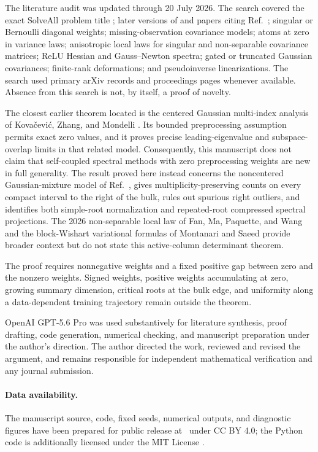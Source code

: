 The literature audit was updated through 20 July 2026.  The search covered the
exact SolveAll problem title \cite{SolveAllProblem}; later versions of and
papers citing Ref.~\cite{BenArousEtAl2025}; singular or Bernoulli diagonal
weights; missing-observation covariance models; atoms at zero in variance
laws; anisotropic local laws for singular and non-separable covariance
matrices; ReLU Hessian and Gauss--Newton spectra; gated or truncated Gaussian
covariances; finite-rank deformations; and pseudoinverse linearizations.  The
search used primary arXiv records and proceedings pages whenever available.
Absence from this search is not, by itself, a proof of novelty.

The closest earlier theorem located is the centered Gaussian multi-index
analysis of Kova\v{c}evi\'c, Zhang, and Mondelli
\cite{KovacevicEtAl2025}.  Its bounded preprocessing assumption permits exact
zero values, and it proves precise leading-eigenvalue and subspace-overlap
limits in that related model.  Consequently, this manuscript does not claim
that self-coupled spectral methods with zero preprocessing weights are new in
full generality.  The result proved here instead concerns the noncentered
Gaussian-mixture model of Ref.~\cite{BenArousEtAl2025}, gives
multiplicity-preserving counts on every compact interval to the right of the
bulk, rules out spurious right outliers, and identifies both simple-root
normalization and repeated-root compressed spectral projections.  The 2026
non-separable local law of Fan, Ma, Paquette, and Wang
\cite{FanEtAl2026} and the block-Wishart variational formulas of Montanari and
Saeed \cite{MontanariSaeed2026} provide broader context but do not state this
active-column determinant theorem.

The proof requires nonnegative weights and a fixed positive gap between zero
and the nonzero weights. Signed weights, positive weights accumulating at
zero, growing summary dimension, critical roots at the bulk edge, and
uniformity along a data-dependent training trajectory remain outside the
theorem.

\begin{acknowledgments}
OpenAI GPT-5.6 Pro was used substantively for literature synthesis, proof drafting, code generation, numerical checking, and manuscript preparation under the author's direction. The author directed the work, reviewed and revised the argument, and remains responsible for independent mathematical verification and any journal submission.
\end{acknowledgments}

\paragraph*{Data availability.}
The manuscript source, code, fixed seeds, numerical outputs, and diagnostic
figures have been prepared for public release at \RepositoryURL\ under CC
BY 4.0; the Python code is additionally licensed under the MIT License
\cite{PetkovRepository}.




